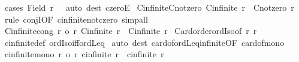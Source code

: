 \begin{isabellebody}
\ {\isacharparenleft}{\kern0pt}cases\ {\isachardoublequoteopen}Field\ r\ {\isacharequal}{\kern0pt}\ {\isacharbraceleft}{\kern0pt}{\isacharbraceright}{\kern0pt}{\isachardoublequoteclose}{\isacharparenright}{\kern0pt}\ {\isacharparenleft}{\kern0pt}auto\ dest{\isacharcolon}{\kern0pt}\ czeroE{\isacharparenright}{\kern0pt}%
\endisatagproof
{\isafoldproof}%
%
\isadelimproof
\isanewline
%
\endisadelimproof
\isanewline
{}\isamarkupfalse%
\ Cinfinite{\isacharunderscore}{\kern0pt}Cnotzero{\isacharcolon}{\kern0pt}\ {\isachardoublequoteopen}Cinfinite\ r\ {\isasymLongrightarrow}\ Cnotzero\ r{\isachardoublequoteclose}\isanewline
%
\isadelimproof
%
\endisadelimproof
%
\isatagproof
{}\isamarkupfalse%
\ {\isacharparenleft}{\kern0pt}rule\ conjI{\isacharbrackleft}{\kern0pt}OF\ cinfinite{\isacharunderscore}{\kern0pt}not{\isacharunderscore}{\kern0pt}czero{\isacharbrackright}{\kern0pt}{\isacharparenright}{\kern0pt}\ simp{\isacharunderscore}{\kern0pt}all%
\endisatagproof
{\isafoldproof}%
%
\isadelimproof
\isanewline
%
\endisadelimproof
\isanewline
{}\isamarkupfalse%
\ Cinfinite{\isacharunderscore}{\kern0pt}cong{\isacharcolon}{\kern0pt}\ {\isachardoublequoteopen}{\isasymlbrakk}r{}\ {\isacharequal}{\kern0pt}o\ r{}{\isacharsemicolon}{\kern0pt}\ Cinfinite\ r{}{\isasymrbrakk}\ {\isasymLongrightarrow}\ Cinfinite\ r{}{\isachardoublequoteclose}\isanewline
%
\isadelimproof
%
\endisadelimproof
%
\isatagproof
{}\isamarkupfalse%
\ Card{\isacharunderscore}{\kern0pt}order{\isacharunderscore}{\kern0pt}ordIso{}{\isacharbrackleft}{\kern0pt}of\ r{}\ r{}{\isacharbrackright}{\kern0pt}\ \isamarkupfalse%
\ cinfinite{\isacharunderscore}{\kern0pt}def\ ordIso{\isacharunderscore}{\kern0pt}iff{\isacharunderscore}{\kern0pt}ordLeq\isanewline
{}\isamarkupfalse%
\ {\isacharparenleft}{\kern0pt}auto\ dest{\isacharcolon}{\kern0pt}\ card{\isacharunderscore}{\kern0pt}of{\isacharunderscore}{\kern0pt}ordLeq{\isacharunderscore}{\kern0pt}infinite{\isacharbrackleft}{\kern0pt}OF\ card{\isacharunderscore}{\kern0pt}of{\isacharunderscore}{\kern0pt}mono{}{\isacharbrackright}{\kern0pt}{\isacharparenright}{\kern0pt}%
\endisatagproof
{\isafoldproof}%
%
\isadelimproof
\isanewline
%
\endisadelimproof
\isanewline
{}\isamarkupfalse%
\ cinfinite{\isacharunderscore}{\kern0pt}mono{\isacharcolon}{\kern0pt}\ {\isachardoublequoteopen}{\isasymlbrakk}r{}\ {\isasymle}o\ r{}{\isacharsemicolon}{\kern0pt}\ cinfinite\ r{}{\isasymrbrakk}\ {\isasymLongrightarrow}\ cinfinite\ r{}{\isachardoublequoteclose}\isanewline

\end{isabellebody}
